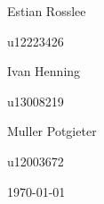 \documentclass[hidelinks,a4paper,12pt]{article}
\begin{document}
\begin{titlepage}
\begin{center}
\begin{minipage}{0.4\textwidth}
\begin{flushleft} \large
Estian {Rosslee}
\end{flushleft}
\end{minipage}
\begin{minipage}{0.4\textwidth}
\begin{flushright} \large
\emph{}
u12223426
\end{flushright}
\end{minipage}

\begin{minipage}{0.4\textwidth}
\begin{flushleft} \large
Ivan {Henning}
\end{flushleft}
\end{minipage}
\begin{minipage}{0.4\textwidth}
\begin{flushright} \large
\emph{}
u13008219
\end{flushright}
\end{minipage}

\begin{minipage}{0.4\textwidth}
\begin{flushleft} \large
Muller {Potgieter}
\end{flushleft}
\end{minipage}
\begin{minipage}{0.4\textwidth}
\begin{flushright} \large
\emph{}
u12003672
\end{flushright}
\end{minipage}

\vfill
{\large \today}
\end{center}
\end{titlepage}
\footnotesize
%
\normalsize


\tableofcontents
\newpage
{}

\newpage
\end{document}
